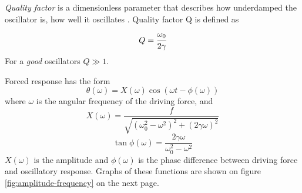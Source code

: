 \documentclass[12pt,a4paper]{article}
\begin{document}
	\textit{Quality factor} is a dimensionless parameter that describes how underdamped the oscillator is, how well it oscillates \cite{feynman-transient}. Quality factor Q is defined as
	\begin{equation}\label{eq:q-factor}
	Q=\cfrac{\omega_0}{2\gamma}
	\end{equation}
	For a \textit{good} oscillators $Q \gg 1$. 
	
	Forced response has the form
	\begin{equation}\label{eq:solution-forced}
	\theta(\omega)=X(\omega)\cos(\omega t - \phi(\omega))	
	\end{equation}
	where $\omega$ is the angular frequency of the driving force, and
	\begin{equation}\label{eq:solution-amplitude}
	X(\omega)=\frac{f}{\sqrt{(\omega_0^2-\omega^2)^2+(2 \gamma \omega)^2}}	
	\end{equation}
	\begin{equation}\label{eq:solution-phase}
	\tan \phi(\omega)=\frac{2\gamma \omega}{\omega_0^2-\omega^2}	
	\end{equation}
	$X(\omega)$ is the amplitude and $\phi(\omega)$ is the phase difference between driving force and oscillatory response. Graphs of these functions are shown on figure \ref{fig:amplitude-frequency} on the next page.
\end{document}
